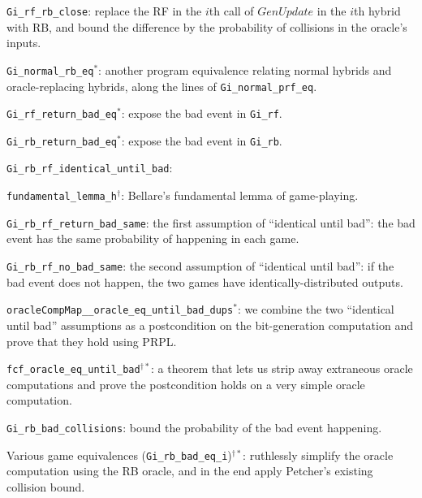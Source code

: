 \documentclass[12pt,lot, lof]{puthesis}
\newcommand{\li} {\lstinline}
\begin{document}
{\begin{longenum}
\begin{longenum}
  \item \li|Gi_rf_rb_close|: replace the RF in the $i$th call of $GenUpdate$ in the $i$th hybrid with RB, and bound the difference by the probability of collisions in the oracle's inputs.
    \begin{longenum}
    \item \li|Gi_normal_rb_eq|$^*$: another program equivalence relating normal hybrids and oracle-replacing hybrids, along the lines of \li|Gi_normal_prf_eq|.
    \item \li|Gi_rf_return_bad_eq|$^*$: expose the bad event in \li|Gi_rf|.
    \item \li|Gi_rb_return_bad_eq|$^*$: expose the bad event in \li|Gi_rb|.
    \item \li|Gi_rb_rf_identical_until_bad|: 
      \begin{longenum}
      \item \li|fundamental_lemma_h|$^\dag$: Bellare's fundamental lemma of game-playing.
      \item \li|Gi_rb_rf_return_bad_same|: the first assumption of ``identical until bad'': the bad event has the same probability of happening in each game.
      \item \li|Gi_rb_rf_no_bad_same|: the second assumption of ``identical until bad'': if the bad event does not happen, the two games have identically-distributed outputs.
        \begin{longenum}
        \item \li|oracleCompMap__oracle_eq_until_bad_dups|$^*$: we combine the two ``identical until bad'' assumptions as a postcondition on the bit-generation computation and prove that they hold using PRPL.
          \begin{longenum}
            \item \li|fcf_oracle_eq_until_bad|$^{\dag *}$: a theorem that lets us strip away extraneous oracle computations and prove the postcondition holds on a very simple oracle computation.
          \end{longenum}
        \end{longenum}
      \end{longenum}
    \item \li|Gi_rb_bad_collisions|: bound the probability of the bad event happening.
      \begin{longenum}
      \item Various game equivalences (\li|Gi_rb_bad_eq_i|)$^{\dag *}$: ruthlessly simplify the oracle computation using the RB oracle, and in the end apply Petcher's existing collision bound.
      \end{longenum}
    \end{longenum}
  \end{longenum} 
\end{longenum}

}
\end{document}
